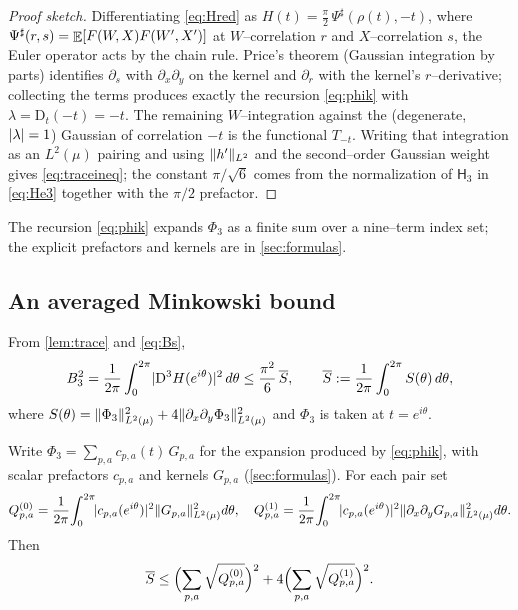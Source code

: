 \documentclass[12pt]{article}
\newcommand{\He}{\mathsf{H}}                 %
\newcommand{\Dop}{\mathrm{D}}              %
\begin{document}
\begin{proof}[Proof sketch]
Differentiating \eqref{eq:Hred} as $H(t)=\tfrac\pi2\,\Psi^{\sharp}(\rho(t),-t)$,
where $\Psi^{\sharp}(r,s)=\mathop{\mathbb{E}}[F(W,X)F(W',X')]$ at $W$--correlation $r$ and
$X$--correlation $s$, the Euler operator acts by the chain rule.  Price's theorem
(Gaussian integration by parts) identifies $\partial_s$ with $\partial_x\partial_y$
on the kernel and $\partial_r$ with the kernel's $r$--derivative; collecting the
terms produces exactly the recursion \eqref{eq:phik} with $\lambda=\Dop_t(-t)=-t$.
The remaining $W$--integration against the (degenerate, $\lvert\lambda\rvert=1$) Gaussian
of correlation $-t$ is the functional $T_{-t}$.  Writing that integration as an
$L^2(\mu)$ pairing and using $\lVert h'\rVert_{L^2}$ and the second--order Gaussian
weight gives \eqref{eq:traceineq}; the constant $\pi/\sqrt6$ comes from the
normalization of $\He_3$ in \eqref{eq:He3} together with the $\pi/2$ prefactor.
\end{proof}

The recursion \eqref{eq:phik} expands $\Phi_3$ as a finite sum over a
nine--term index set; the explicit prefactors and kernels are in
\cref{sec:formulas}.

\subsection{An averaged Minkowski bound}

From \cref{lem:trace} and \eqref{eq:Bs},
\begin{equation}\label{eq:B3avg}
   B_3^2=\frac{1}{2\pi}\int_0^{2\pi}\abs{\Dop^3H(e^{i\theta})}^2\,d\theta
   \le\frac{\pi^2}{6}\,\overline S,
   \qquad
   \overline S:=\frac{1}{2\pi}\int_0^{2\pi}S(\theta)\,d\theta,
\end{equation}
where $S(\theta)=\lVert\Phi_3\rVert_{L^2(\mu)}^2+4\lVert\partial_x\partial_y\Phi_3\rVert_{L^2(\mu)}^2$
and $\Phi_3$ is taken at $t=e^{i\theta}$.

\begin{lemma}\label{lem:mink}
Write $\Phi_3=\sum_{p,a}c_{p,a}(t)\,G_{p,a}$ for the expansion produced by
\eqref{eq:phik}, with scalar prefactors $c_{p,a}$ and kernels $G_{p,a}$
(\cref{sec:formulas}).  For each pair set
\[
   Q^{(0)}_{p,a}=\frac{1}{2\pi}\!\int_0^{2\pi}\!\lvert c_{p,a}(e^{i\theta})\rvert^2
            \lVert G_{p,a}\rVert_{L^2(\mu)}^2 d\theta,
   \quad
   Q^{(1)}_{p,a}=\frac{1}{2\pi}\!\int_0^{2\pi}\!\lvert c_{p,a}(e^{i\theta})\rvert^2
            \lVert\partial_x\partial_yG_{p,a}\rVert_{L^2(\mu)}^2 d\theta .
\]
Then
\begin{equation}\label{eq:Smink}
   \overline S\le
   \Bigl(\sum_{p,a}\sqrt{Q^{(0)}_{p,a}}\Bigr)^{2}
   +4\Bigl(\sum_{p,a}\sqrt{Q^{(1)}_{p,a}}\Bigr)^{2}.
\end{equation}
\end{lemma}
\end{document}
